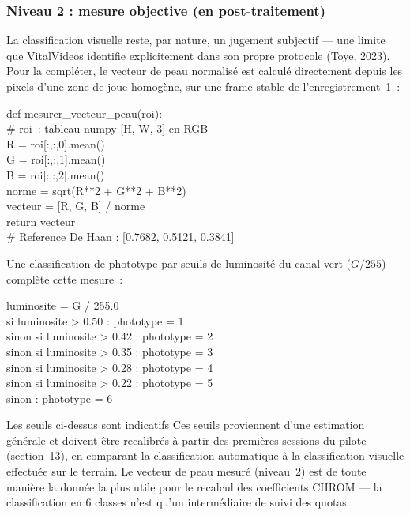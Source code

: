 \documentclass[11pt,a4paper]{article}
\begin{document}
\subsubsection*{Niveau 2 : mesure objective (en post-traitement)}

La classification visuelle reste, par nature, un jugement subjectif --- une
limite que VitalVideos identifie explicitement dans son propre protocole
(Toye, 2023). Pour la compl\'eter, le vecteur de peau normalis\'e est
calcul\'e directement depuis les pixels d'une zone de joue homog\`ene, sur
une frame stable de l'enregistrement~1~:

\begin{codebox}
def mesurer\_vecteur\_peau(roi):\\
\quad\# roi~: tableau numpy [H, W, 3] en RGB\\
\quad R = roi[:,:,0].mean()\\
\quad G = roi[:,:,1].mean()\\
\quad B = roi[:,:,2].mean()\\[4pt]
\quad norme = sqrt(R**2 + G**2 + B**2)\\
\quad vecteur = [R, G, B] / norme\\[4pt]
\quad return vecteur\\
\quad \# Reference De Haan : [0.7682, 0.5121, 0.3841]
\end{codebox}

Une classification de phototype par seuils de luminosit\'e du canal vert
($G/255$) compl\`ete cette mesure~:

\begin{codebox}
luminosite = G / 255.0\\[2pt]
si luminosite \textgreater{} 0.50 : phototype = 1\\
sinon si luminosite \textgreater{} 0.42 : phototype = 2\\
sinon si luminosite \textgreater{} 0.35 : phototype = 3\\
sinon si luminosite \textgreater{} 0.28 : phototype = 4\\
sinon si luminosite \textgreater{} 0.22 : phototype = 5\\
sinon : phototype = 6
\end{codebox}

\begin{warnbox}{Les seuils ci-dessus sont indicatifs}
Ces seuils proviennent d'une estimation g\'en\'erale et doivent \^etre
recalibr\'es \`a partir des premi\`eres sessions du pilote (section~13), en
comparant la classification automatique \`a la classification visuelle
effectu\'ee sur le terrain. Le vecteur de peau mesur\'e (niveau~2) est de
toute mani\`ere la donn\'ee la plus utile pour le recalcul des coefficients
CHROM --- la classification en 6 classes n'est qu'un interm\'ediaire de
suivi des quotas.
\end{warnbox}
\end{document}
